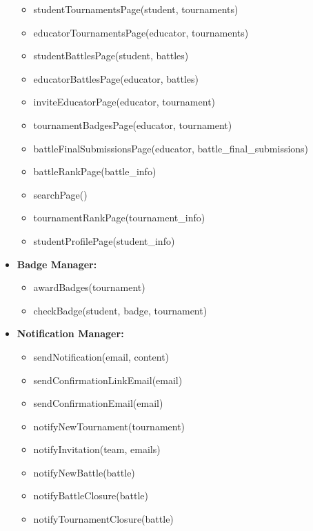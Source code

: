 \begin{itemize}
\begin{itemize}
        \item studentTournamentsPage(student, tournaments)
        \item educatorTournamentsPage(educator, tournaments)

        \item studentBattlesPage(student, battles)
        \item educatorBattlesPage(educator, battles)

        \item inviteEducatorPage(educator, tournament)
        \item tournamentBadgesPage(educator, tournament)
        \item battleFinalSubmissionsPage(educator, battle\_final\_submissions)
        \item battleRankPage(battle\_info)
        \item searchPage()
        \item tournamentRankPage(tournament\_info)
        \item studentProfilePage(student\_info)
        
    \end{itemize}

    \item \textbf{Badge Manager:}
    \begin{itemize}
        \item awardBadges(tournament)
        \item checkBadge(student, badge, tournament)
    \end{itemize}

    \newpage

    \item \textbf{Notification Manager:}
    \begin{itemize}
        \item sendNotification(email, content)
        \item sendConfirmationLinkEmail(email)
        \item sendConfirmationEmail(email)
        \item notifyNewTournament(tournament)
        \item notifyInvitation(team, emails)
        \item notifyNewBattle(battle)
        \item notifyBattleClosure(battle)
        \item notifyTournamentClosure(battle)
    \end{itemize}


\end{itemize}
